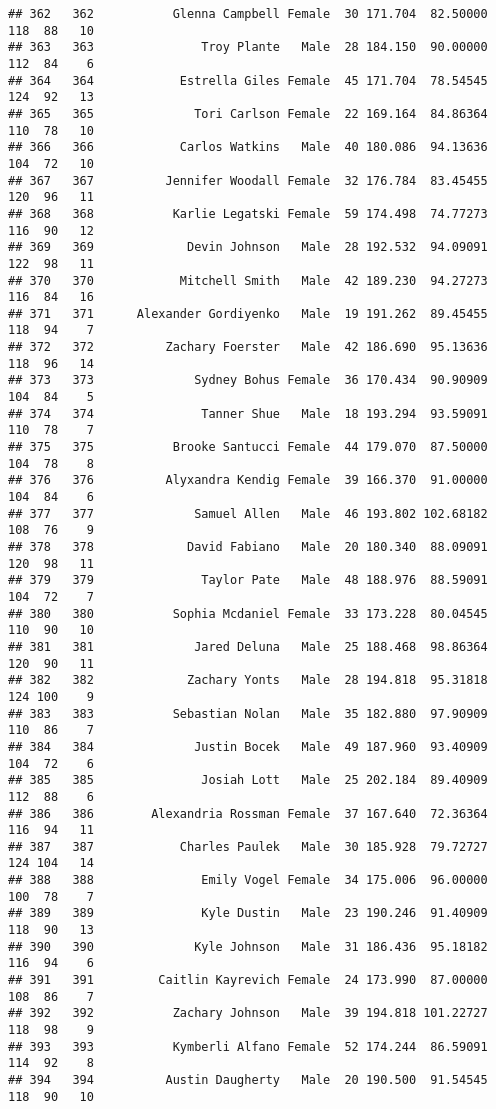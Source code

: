 \documentclass[
]{article}
\begin{document}
\begin{verbatim}
## 362   362           Glenna Campbell Female  30 171.704  82.50000 118  88   10
## 363   363               Troy Plante   Male  28 184.150  90.00000 112  84    6
## 364   364            Estrella Giles Female  45 171.704  78.54545 124  92   13
## 365   365              Tori Carlson Female  22 169.164  84.86364 110  78   10
## 366   366            Carlos Watkins   Male  40 180.086  94.13636 104  72   10
## 367   367          Jennifer Woodall Female  32 176.784  83.45455 120  96   11
## 368   368           Karlie Legatski Female  59 174.498  74.77273 116  90   12
## 369   369             Devin Johnson   Male  28 192.532  94.09091 122  98   11
## 370   370            Mitchell Smith   Male  42 189.230  94.27273 116  84   16
## 371   371      Alexander Gordiyenko   Male  19 191.262  89.45455 118  94    7
## 372   372          Zachary Foerster   Male  42 186.690  95.13636 118  96   14
## 373   373              Sydney Bohus Female  36 170.434  90.90909 104  84    5
## 374   374               Tanner Shue   Male  18 193.294  93.59091 110  78    7
## 375   375           Brooke Santucci Female  44 179.070  87.50000 104  78    8
## 376   376          Alyxandra Kendig Female  39 166.370  91.00000 104  84    6
## 377   377              Samuel Allen   Male  46 193.802 102.68182 108  76    9
## 378   378             David Fabiano   Male  20 180.340  88.09091 120  98   11
## 379   379               Taylor Pate   Male  48 188.976  88.59091 104  72    7
## 380   380           Sophia Mcdaniel Female  33 173.228  80.04545 110  90   10
## 381   381              Jared Deluna   Male  25 188.468  98.86364 120  90   11
## 382   382             Zachary Yonts   Male  28 194.818  95.31818 124 100    9
## 383   383           Sebastian Nolan   Male  35 182.880  97.90909 110  86    7
## 384   384              Justin Bocek   Male  49 187.960  93.40909 104  72    6
## 385   385               Josiah Lott   Male  25 202.184  89.40909 112  88    6
## 386   386        Alexandria Rossman Female  37 167.640  72.36364 116  94   11
## 387   387            Charles Paulek   Male  30 185.928  79.72727 124 104   14
## 388   388               Emily Vogel Female  34 175.006  96.00000 100  78    7
## 389   389               Kyle Dustin   Male  23 190.246  91.40909 118  90   13
## 390   390              Kyle Johnson   Male  31 186.436  95.18182 116  94    6
## 391   391         Caitlin Kayrevich Female  24 173.990  87.00000 108  86    7
## 392   392           Zachary Johnson   Male  39 194.818 101.22727 118  98    9
## 393   393           Kymberli Alfano Female  52 174.244  86.59091 114  92    8
## 394   394          Austin Daugherty   Male  20 190.500  91.54545 118  90   10

\end{verbatim}
\end{document}
